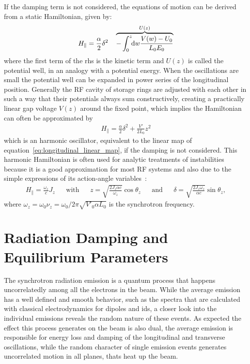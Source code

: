     If the damping term is not considered, the equations of motion can be derived from a static Hamiltonian, given by:
	\begin{align}\label{eq:longitudinal_hamiltonian}
		H_\parallel = \frac\alpha2\delta^2 \quad \overbrace{-
                            \defint{w}{\frac{V(w)-U_0}{L_0E_0}}{0}{z}
                        }^{U(z)}
	\end{align}
	where the first term of the \gls{rhs} is the kinetic term and $U(z)$ is called the potential well, in an analogy with a potential energy. When the oscillations are small the potential well can be expanded in power series of the longitudinal position. Generally the RF cavity of storage rings are adjusted with each other in such a way that their potentials always sum constructively, creating a practically linear gap voltage $V(z)$ around the fixed point, which implies the Hamiltonian can often be approximated by
    \begin{align}\label{eq:quadratic_potential_well}
        H_\parallel = \frac\alpha2\delta^2 + \frac{V'}{2L_0}z^2
    \end{align}
    which is an harmonic oscillator, equivalent to the linear map of equation~\eqref{eq:longitudinal_linear_map}, if the damping is not considered. This harmonic Hamiltonian is often used for analytic treatments of instabilities because it is a good approximation for most RF systems and also due to the simple expressions of its action-angle variables~\cite[sec. III]{Lindberg2016}:
    \begin{align}
        H_\parallel = \frac{\omega_z}{c}J_z && \text{with} &&
        z = \sqrt{\frac{2J_z \alpha c}{\omega_z}}\cos\theta_z && \text{and} &&
        \delta = \sqrt{\frac{2J_z\omega_z}{ \alpha c}}\sin\theta_z,
    \end{align}
    where $\omega_z = \omega_0\nu_z=\omega_0/2\pi\sqrt{V'_0\alpha L_0}$ is the synchrotron frequency.

\section{Radiation Damping and Equilibrium Parameters}

    The synchrotron radiation emission is a quantum process that happens uncorrelatedly among all the electrons in the beam. While the average emission has a well defined and smooth behavior, such as the spectra that are calculated with classical electrodynamics for dipoles and \glspl{id}, a closer look into the individual emissions reveals the random nature of these events. As expected the effect this process generates on the beam is also dual, the average emission is responsible for energy loss and damping of the longitudinal and transverse oscillations, while the random character of single emission events generates uncorrelated motion in all planes, thats heat up the beam.

